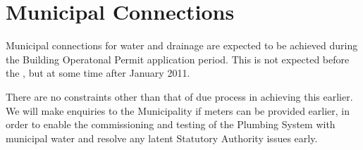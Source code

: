 \chapter{Municipal Connections}

Municipal connections for water and drainage are expected to be achieved during the Building Operatonal Permit application period. This is not expected before the \deadline, but at some time after January 2011.

There are no constraints other than that of due process in achieving this earlier. We will make enquiries to the Municipality if meters can be provided earlier, in order to enable the commissioning and testing of the Plumbing System with municipal water and resolve any latent Statutory Authority issues early.



